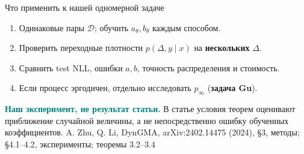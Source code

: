 \documentclass[10pt,aspectratio=169]{beamer}
\newcommand{\dynsrc}[1]{\vfill{\tiny\color{graytext}A. Zhu, Q. Li, DynGMA, arXiv:2402.14475 (2024), #1}}
\begin{document}
\begin{frame}{Что применить к нашей одномерной задаче}
\vspace{0.10cm}
\begin{center}
\end{center}
\vspace{0.14cm}
\begin{enumerate}\setlength\itemsep{0.13cm}
\item Одинаковые пары $\mathcal D$; обучить $a_\theta,b_\theta$ каждым способом.
\item Проверить переходные плотности $p(\Delta,y\mid x)$ на \textbf{нескольких} $\Delta$.
\item Сравнить test NLL, ошибки $a,b$, точность распределения и стоимость.
\item Если процесс эргодичен, отдельно исследовать $p_\infty$ (\textbf{задача Gu}).
\end{enumerate}
\vspace{0.10cm}
\small\textcolor{teal}{\bfseries Наш эксперимент, не результат статьи.} В статье условия теорем оценивают приближение случайной величины, а не непосредственно ошибку обученных коэффициентов.
\dynsrc{\S 3, методы; \S 4.1--4.2, эксперименты; теоремы 3.2--3.4}
\end{frame}
\end{document}

